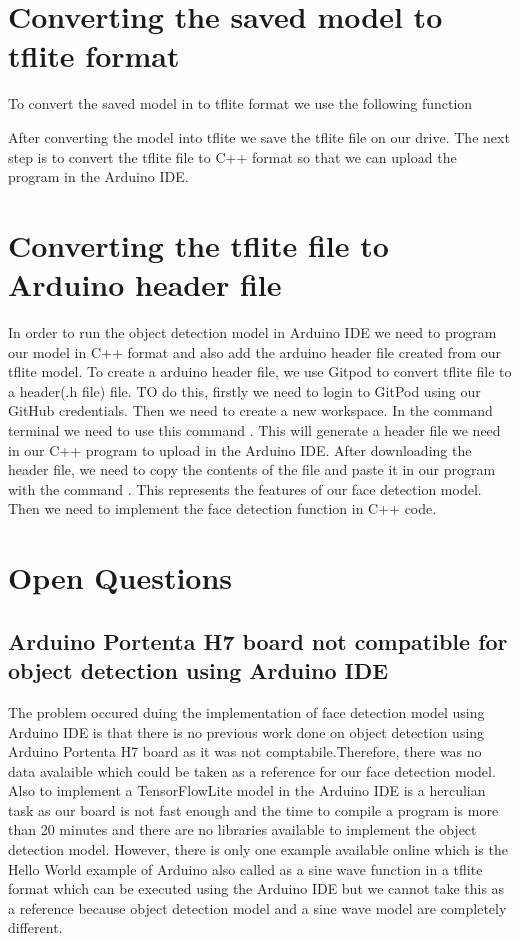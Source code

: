 	\section{Converting the saved model to tflite format}

To convert the saved model in to tflite format we use the following function 

After converting the model into tflite we save the tflite file on our drive. The next step is to convert the tflite file to C++ format so that we can upload the program in the Arduino IDE.

\section{Converting the tflite file to Arduino header file}
	In order to run the object detection model in Arduino IDE we need to program our model in C++ format and also add the arduino header file created from our tflite model. To create a arduino header file, we use Gitpod to convert tflite file to a header(.h file) file. TO do this, firstly we need to login to GitPod using our GitHub credentials. Then we need to create a new workspace. In the command terminal we need to use this command .
	This will generate a header file we need in our C++ program to upload in the Arduino IDE. After downloading the header file, we need to copy the contents of the file and paste it in our program with the command . This represents the features of our face detection model. Then we need to implement the face detection function in C++ code.
	\section{Open Questions}
	\subsection{Arduino Portenta H7 board not compatible for object detection using Arduino IDE}
	The problem occured duing the implementation of face detection model using Arduino IDE is that there is no previous work done on object detection using Arduino Portenta H7 board as it was not comptabile\cite{GoogleTensorFlowLite:2021}.Therefore, there was no data avalaible which could be taken as a reference for our face detection model. Also to implement a TensorFlowLite model in the Arduino IDE is a herculian task as our board is not fast enough and the  time to compile a program is more than 20 minutes and there are no libraries available to implement the object detection model. However, there is only one example available online which is the Hello World example of Arduino also called as a sine wave function in a tflite format which can be executed using the Arduino IDE but we cannot take this as a reference because object detection model and a sine wave model are completely different. 
